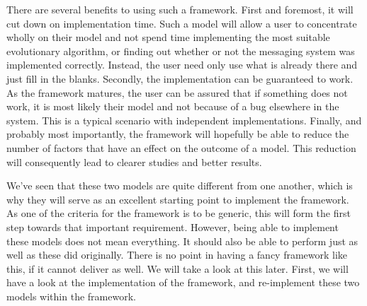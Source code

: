 There are several benefits to using such a framework. First and foremost, it will cut down on implementation time. Such a model will allow a user to concentrate wholly on their model and not spend time implementing the most suitable evolutionary algorithm, or finding out whether or not the messaging system was implemented correctly. Instead, the user need only use what is already there and just fill in the blanks. Secondly, the implementation can be guaranteed to work. As the framework matures, the user can be assured that if something does not work, it is most likely their model and not because of a bug elsewhere in the system. This is a typical scenario with independent implementations. Finally, and probably most importantly, the framework will hopefully be able to reduce the number of factors that have an effect on the outcome of a model. This reduction will consequently lead to clearer studies and better results.

We've seen that these two models are quite different from one another, which is why they will serve as an excellent starting point to implement the framework. As one of the criteria for the framework is to be generic, this will form the first step towards that important requirement. However, being able to implement these models does not mean everything. It should also be able to perform just as well as these did originally. There is no point in having a fancy framework like this, if it cannot deliver as well. We will take a look at this later. First, we will have a look at the implementation of the framework, and re-implement these two models within the framework.
